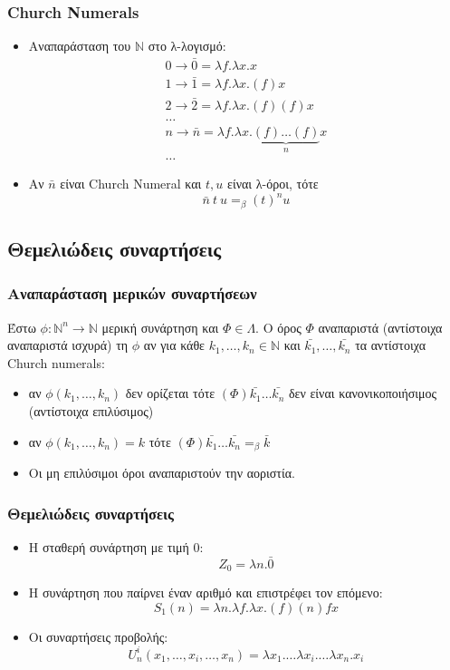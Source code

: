 \documentclass{beamer}
\begin{document}
\begin{frame}
  \frametitle{Church Numerals}
  \begin{itemize}
  \item Αναπαράσταση του $ \mathbb{N} $ στο λ-λογισμό:
    \pause
    $$
    \begin{array}{l}
      0 \rightarrow \bar{0} = \lambda f . \lambda x . x \\
      1 \rightarrow \bar{1} = \lambda f . \lambda x . (f) x \\
      2 \rightarrow \bar{2} = \lambda f . \lambda x . (f) (f) x \\
      \ldots \\
      n \rightarrow \bar{n} = \lambda f . \lambda x . \underbrace{(f)
        \ldots (f)}_n x \\
      \ldots
    \end{array}
    $$
    \pause
  \item Αν $\bar{n} $ είναι Church Numeral και $t, u$ είναι λ-όροι, τότε
    $$ \bar{n}\:t\:u =_\beta (t)^n u $$
  \end{itemize}
\end{frame}

\subsection{Θεμελιώδεις συναρτήσεις}

\begin{frame}
  \frametitle{Αναπαράσταση μερικών συναρτήσεων}
  Έστω $\phi : \mathbb{N}^n \rightarrow \mathbb{N}$ μερική συνάρτηση
  και $\Phi \in \Lambda $. O όρος $\Phi$ αναπαριστά (αντίστοιχα
  αναπαριστά ισχυρά) τη $\phi$ αν για κάθε $k_1,\ldots, k_n \in
  \mathbb{N}$ και $ \bar{k_1}, \ldots, \bar{k_n}$ τα
  αντίστοιχα Church numerals: \pause
  \begin{itemize}
  \item αν $\phi(k_1,\ldots,k_n)$ δεν ορίζεται τότε $(\Phi)
    \bar{k_1} \ldots \bar{k_n}$ δεν είναι
    κανονικοποιήσιμος (αντίστοιχα επιλύσιμος) \pause
  \item αν $\phi(k_1,\ldots,k_n) = k$ τότε $(\Phi) \bar{k_1}
    \ldots \bar{k_n} =_\beta \bar{k}$ \pause
  \item Οι μη επιλύσιμοι όροι αναπαριστούν την αοριστία.
  \end{itemize}
\end{frame}

\begin{frame}
  \frametitle{Θεμελιώδεις συναρτήσεις}
  \begin{itemize}
  \item Η σταθερή συνάρτηση με τιμή 0:
    $$Z_0=\lambda n . \bar{0}$$
    \pause
  \item Η συνάρτηση που παίρνει έναν αριθμό και επιστρέφει τον
    επόμενο:
    $$S_1(n)=\lambda n . \lambda f . \lambda x . (f) (n) f x$$
    \pause
  \item Οι συναρτήσεις προβολής: $$U^i_n(x_1,\ldots,x_i,\ldots,x_n)=
    \lambda x_1 . \ldots \lambda x_i . \ldots \lambda x_n . x_i$$
  \end{itemize}
\end{frame}
\end{document}
